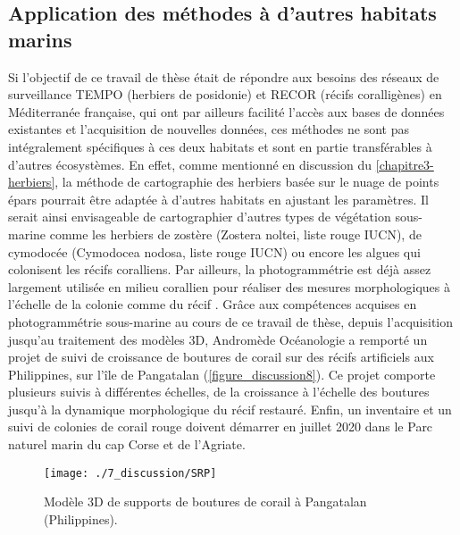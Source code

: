 \subsection{Application des méthodes à d’autres habitats marins}

Si l’objectif de ce travail de thèse était de répondre aux besoins des réseaux de surveillance TEMPO (herbiers de posidonie) et RECOR (récifs coralligènes) en Méditerranée française, qui ont par ailleurs facilité l’accès aux bases de données existantes et l’acquisition de nouvelles données, ces méthodes ne sont pas intégralement spécifiques à ces deux habitats et sont en partie transférables à d’autres écosystèmes. En effet, comme mentionné en discussion du \autoref{chapitre3-herbiers}, la méthode de cartographie des herbiers basée sur le nuage de points épars pourrait être adaptée à d’autres habitats en ajustant les paramètres. Il serait ainsi envisageable de cartographier d’autres types de végétation sous-marine comme les herbiers de zostère (Zostera noltei, liste rouge IUCN), de cymodocée (Cymodocea nodosa, liste rouge IUCN) ou encore les algues qui colonisent les récifs coralliens. Par ailleurs, la photogrammétrie est déjà assez largement utilisée en milieu corallien pour réaliser des mesures morphologiques à l’échelle de la colonie \citep{courtney_estimating_2007, agudo-adriani_colony_2016, zawada_quantifying_2019} comme du récif \citep{leon_measuring_2015, burns_assessing_2016, bryson_characterization_2017, pizarro_simple_2017, anelli_towards_2019}. Grâce aux compétences acquises en photogrammétrie sous-marine au cours de ce travail de thèse, depuis l’acquisition jusqu’au traitement des modèles 3D, Andromède Océanologie a remporté un projet de suivi de croissance de boutures de corail sur des récifs artificiels aux Philippines, sur l’île de Pangatalan (\autoref{figure_discussion8}). Ce projet comporte plusieurs suivis à différentes échelles, de la croissance à l’échelle des boutures jusqu’à la dynamique morphologique du récif restauré. Enfin, un inventaire et un suivi de colonies de corail rouge doivent démarrer en juillet 2020 dans le Parc naturel marin du cap Corse et de l’Agriate.

\begin{figure}[H]
	\begin{center}
	\texttt{[image: ./7\_discussion/SRP]}
		\caption{Modèle 3D de supports de boutures de corail à Pangatalan (Philippines).}
	\label{figure_discussion8}
\end{center}
\end{figure}

